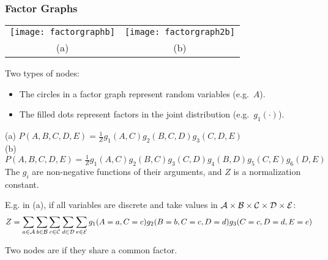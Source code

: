 \begin{frame}
\frametitle{Factor Graphs}

\parbox{65mm}{
\begin{center}
\begin{tabular}{cc}
\texttt{[image: factorgraphb]} & 
\texttt{[image: factorgraph2b]}\\
(a)  &  (b) 
\end{tabular}
\end{center}} \hspace{1.5mm}
\parbox{55mm}{Two types of nodes:
\begin{itemize}
\item The circles in a factor graph represent random variables (e.g.\ $A$). 
\item The filled dots represent factors in the joint distribution
  (e.g.\ $g_1(\cdot)$).
\end{itemize}}

\vspace{1ex}

\hspace{1em} 
(a) $P(A,B,C,D,E) = \frac{1}{Z} g_1(A,C) g_2(B,C,D) g_3(C,D,E) $ \\[1ex]
\hspace*{1em} 
(b) $P(A,B,C,D,E) = \frac{1}{Z} g_1(A,C) g_2(B,C) g_3(C,D) g_4(B,D)
g_5(C,E) g_6(D,E)$\\

The $g_i$ are non-negative functions of their arguments, and $Z$ is a
normalization constant.

E.g. in (a), if all variables are discrete and take values in ${\cal A} \times
{\cal B} \times {\cal C} \times {\cal D} \times {\cal E}$:
{\small 
\[
Z=\sum_{a \in {\cal A}} \sum_{b \in {\cal B}} \sum_{c \in {\cal C}}
\sum_{d \in {\cal D}} \sum_{e \in {\cal E}} g_1(A=a,C=c) g_2(B=b,C=c,D=d)
g_3(C=c,D=d,E=e)
\]}

Two nodes are  if they share a common factor. 


\end{frame}
